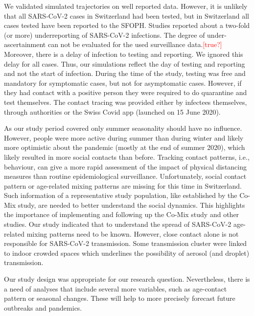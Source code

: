 \documentclass[10pt, a4paper, twoside]{article}
\begin{document}
\begin{multicols}{2}
We validated simulated trajectories on well reported data.
However, it is unlikely that all SARS-CoV-2 cases in Switzerland had been tested, but in Switzerland all cases tested have been reported to the SFOPH.
Studies reported about a two-fold (or more) underreporting of SARS-CoV-2 infections.\cite{Li_substantial_2020,Wu_substantial_2020}
The degree of under-ascertainment can not be evaluated for the used surveillance data.\textcolor{red}{[true?]}
Moreover, there is a delay of infection to testing and reporting.
We ignored this delay for all cases.
Thus, our simulations reflect the day of testing and reporting and not the start of infection.
During the time of the study, testing was free and mandatory for symptomatic cases, but not for asymptomatic cases.
However, if they had contact with a positive person they were required to do quarantine and test themselves.
The contact tracing was provided either by infectees themselves, through authorities or the Swiss Covid app (launched on 15 June 2020).\cite{salath_early_2020}

As our study period covered only summer seasonality should have no influence.
However, people were more active during summer than during winter and likely more optimistic about the pandemic (mostly at the end of summer 2020), which likely resulted in more social contacts than before.
Tracking contact patterns, i.e., behaviour, can give a more rapid assessment of the impact of physical distancing measures than routine epidemiological surveillance.\cite{jarvis_quantifying_2020}
Unfortunately, social contact pattern or age-related mixing patterns are missing for this time in Switzerland.
Such information of a representative study population, like established by the Co-Mix study, are needed to better understand the social dynamics.\cite{coletti_comix_2020}
This highlights the importance of implementing and following up the Co-Mix study and other studies.
Our study indicated that to understand the spread of SARS-CoV-2 age-related mixing patterns need to be known.
However, close contact alone is not responsible for SARS-CoV-2 transmission.
Some transmission cluster were linked to indoor crowded spaces which underlines the possibility of aerosol (and droplet) transmission.\cite{tang_aerosol_2020}

Our study design was appropriate for our research question.
Nevertheless, there is a need of analyses that include several more variables, such as age-contact pattern or seasonal changes.
These will help to more precisely forecast future outbreaks and pandemics.


\end{multicols}
\end{document}
